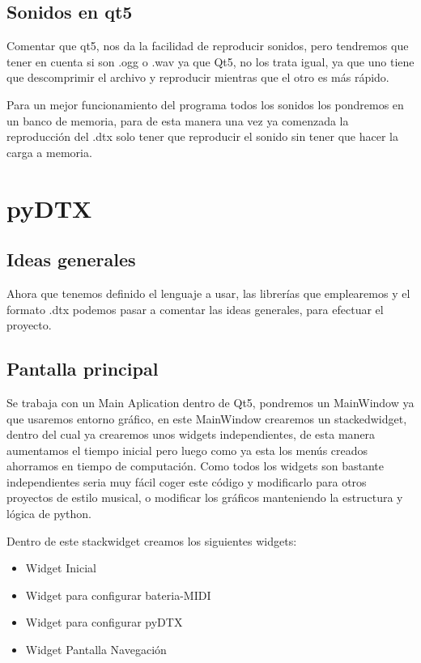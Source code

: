 \documentclass[a4paper,11pt,oneside]{book}
\begin{document}
\section{Sonidos en qt5}
Comentar que qt5, nos da la facilidad de reproducir sonidos, pero tendremos que tener en cuenta si son .ogg o .wav ya que Qt5, no los trata igual,
ya que uno tiene que descomprimir el archivo y reproducir mientras que el otro es más rápido.

Para un mejor funcionamiento del programa todos los sonidos los pondremos en un banco de memoria, para de esta manera una vez ya comenzada la reproducción del .dtx solo tener que reproducir el sonido sin tener que hacer la carga a memoria.


\chapter{pyDTX}
\section{Ideas generales}
Ahora que tenemos definido el lenguaje a usar, las librerías que emplearemos y el formato .dtx podemos pasar a comentar las ideas generales, para efectuar el proyecto.
\section{Pantalla principal}
Se trabaja con un Main Aplication dentro de Qt5, pondremos un MainWindow ya que usaremos entorno gráfico, en este MainWindow crearemos un stackedwidget, dentro del cual ya crearemos unos widgets independientes, de esta manera aumentamos el tiempo inicial pero luego como ya esta los menús creados ahorramos en tiempo de computación. Como todos los widgets son bastante independientes seria muy fácil coger este código y modificarlo para otros proyectos de estilo musical, o modificar los gráficos manteniendo la estructura y lógica de python.

Dentro de este stackwidget creamos los siguientes widgets:

 \begin{itemize}
   \item Widget Inicial
   \item Widget para configurar bateria-MIDI
   \item Widget para configurar pyDTX
   \item Widget Pantalla Navegación
 \end{itemize}
\end{document}
